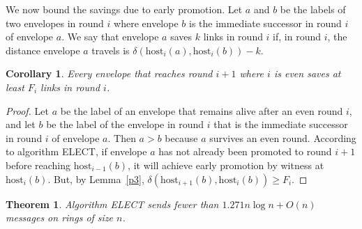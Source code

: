 \documentclass{article}
\newtheorem{theorem}{Theorem}[section]
\newtheorem{corollary}{Corollary}
\begin{document}
We now bound the savings due to early promotion. Let $a$ and $b$ be the labels of two envelopes in round $i$ where envelope $b$ is the immediate successor in round $i$ of envelope $a$. We say that envelope
$a$ saves $k$ links in round $i$ if, in round $i$, the distance envelope $a$ travels is $\delta(\text{host}_i(a), \text{host}_i(b)) - k$.

\begin{corollary}\label{c1}
    Every envelope that reaches round $i+1$ where $i$ is even saves at least $F_i$ links in round $i$.
\end{corollary}

\begin{proof}
    Let $a$ be the label of an envelope that remains alive after an even round $i$, and let $b$ be the label of the envelope in round $i$ that is the immediate successor in round $i$ of envelope $a$. Then $a > b$ because $a$ survives an even round. According to algorithm ELECT, if envelope $a$ has not already been promoted to round $i+1$ before reaching $\text{host}_{i-1}(b)$, it will achieve early promotion by witness at $\text{host}_i(b)$. But, by Lemma~\ref{p3}, $\delta(\text{host}_{i+1}(b), \text{host}_i(b)) \geq F_i$.
\end{proof}

\begin{theorem}\label{t1}
    Algorithm ELECT sends fewer than $1.271n\log n + O(n)$ messages on rings of size $n$.
\end{theorem}
\end{document}
